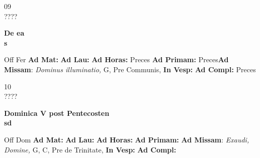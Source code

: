 \documentclass[10pt, openany]{book}
\begin{document}
    \begin{center}
        \begin{minipage}{3.5in}
            \vspace{2em}
            \begin{minipage}{0.5in}
                {\Huge 09} \\
                {\normalsize ????}
            \end{minipage}
            \begin{minipage}{3.0in}
                \textbf{ \large De ea \\
                \textnormal{\normalsize s}}

            \end{minipage}
            \begin{justify}Off Fer
                \textbf{Ad Mat: }
                \textbf{Ad Lau: }
                \textbf{Ad Horas: }Preces
                \textbf{Ad Primam: }Preces\textbf{Ad Missam}: \textit{Dominus illuminatio,} G, Pre Communis, 
                \textbf{In Vesp: }
                \textbf{Ad Compl: }Preces
            \end{justify}
        \end{minipage}
    \end{center}

    \begin{center}
        \begin{minipage}{3.5in}
            \vspace{2em}
            \begin{minipage}{0.5in}
                {\Huge 10} \\
                {\normalsize ????}
            \end{minipage}
            \begin{minipage}{3.0in}
                \textbf{ \large Dominica V post Pentecosten \\
                \textnormal{\normalsize sd}}

            \end{minipage}
            \begin{justify}Off Dom
                \textbf{Ad Mat: }
                \textbf{Ad Lau: }
                \textbf{Ad Horas: }
                \textbf{Ad Primam: }\textbf{Ad Missam}: \textit{Exaudi, Domine,} G, C, Pre de Trinitate, 
                \textbf{In Vesp: }
                \textbf{Ad Compl: }
            \end{justify}
        \end{minipage}
    \end{center}
\end{document}

